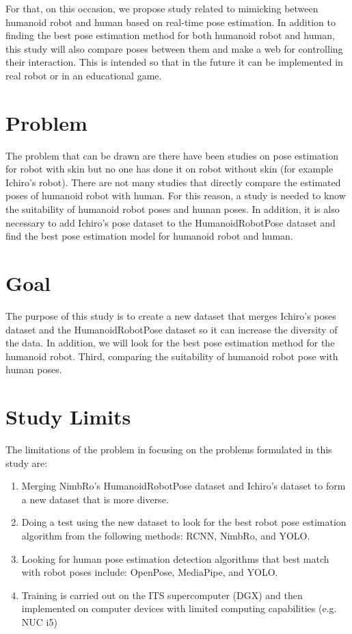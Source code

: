 For that, on this occasion, we propose study related to mimicking between humanoid robot and human based on real-time pose estimation. 
In addition to finding the best pose estimation method for both humanoid robot and human, this study will also compare poses between them and make a web for controlling their interaction.
This is intended so that in the future it can be implemented in real robot or in an educational game.

\section{Problem}
\label{sec:problem}

The problem that can be drawn are there have been studies on pose estimation for robot with skin but no one has done it on robot without skin (for example Ichiro's robot).
There are not many studies that directly compare the estimated poses of humanoid robot with human. 
For this reason, a study is needed to know the suitability of humanoid robot poses and human poses. 
In addition, it is also necessary to add Ichiro's pose dataset to the HumanoidRobotPose dataset and find the best pose estimation model for humanoid robot and human.

\section{Goal}
\label{sec:goal}

The purpose of this study is to create a new dataset that merges Ichiro's poses dataset and the HumanoidRobotPose dataset so it can increase the diversity of the data. In addition,
we will look for the best pose estimation method for the humanoid robot. Third, comparing the suitability of humanoid robot pose with human poses.

\section{Study Limits}
\label{sec:studylimits}

The limitations of the problem in focusing on the problems formulated in this study are:

\begin{enumerate}[nolistsep]

  \item Merging NimbRo's HumanoidRobotPose dataset and Ichiro's dataset to form a new dataset that is more diverse.
  \item Doing a test using the new dataset to look for the best robot pose estimation algorithm from the following methods: RCNN, NimbRo, and YOLO.
  \item Looking for human pose estimation detection algorithms that best match with robot poses include: OpenPose, MediaPipe, and YOLO.
  \item Training is carried out on the ITS supercomputer (DGX) and then implemented on computer devices with limited computing capabilities (e.g. NUC i5)

\end{enumerate}

